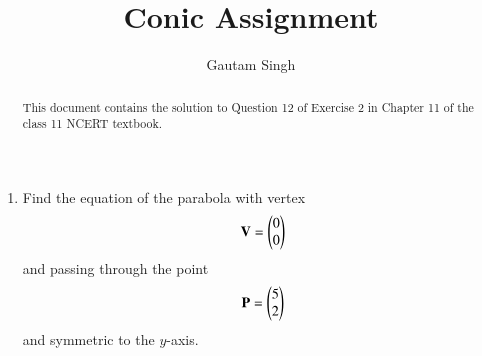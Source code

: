 \documentclass[journal,12pt,twocolumn]{IEEEtran}
\renewcommand{\vec}[1]{\boldsymbol{\mathbf{#1}}}
\begin{document}
\vspace{3cm}
\title{Conic Assignment}
\author{Gautam Singh}
\maketitle
\bigskip

\begin{abstract}
    This document contains the solution to Question 12 of Exercise 2 in Chapter
    11 of the class 11 NCERT textbook.
\end{abstract}

\begin{enumerate}
    \item Find the equation of the parabola with vertex
    \begin{align}
        \vec{V} = \myvec{0\\0}
    \end{align}
    and passing through the point
    \begin{align}
        \vec{P} = \myvec{5\\2}
    \end{align}
    and symmetric to the $y$-axis.


\end{enumerate}
\end{document}
